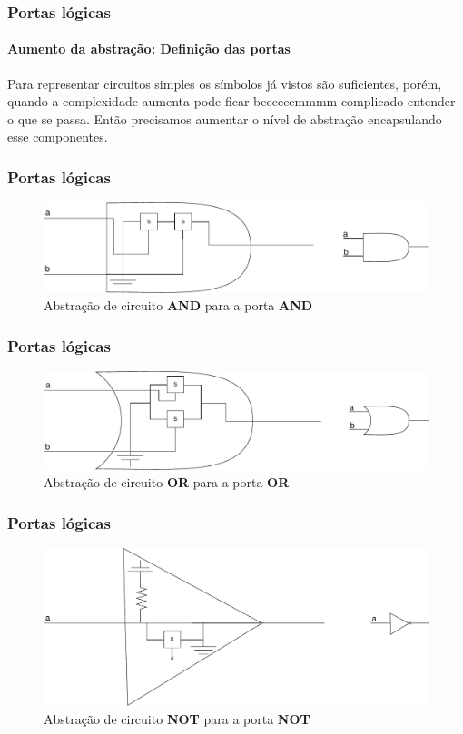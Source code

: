 \begin{frame}
	\frametitle{Portas lógicas}
	\framesubtitle{Aumento da abstração: Definição das portas}
	\par Para representar circuitos simples os símbolos já vistos são suficientes, porém, quando a complexidade aumenta pode ficar beeeeeemmmm complicado entender o que se passa. Então precisamos aumentar o nível de abstração encapsulando esse componentes.
\end{frame}

\begin{frame}
	\frametitle{Portas lógicas}
	\begin{figure}
		\centering
		\includegraphics[width=0.7\linewidth]{images/portaEAbstrata}
		\caption{Abstração de circuito \textbf{AND} para a porta \textbf{AND}}
		\label{fig:portaeabstrata}
	\end{figure}
\end{frame}

\begin{frame}
	\frametitle{Portas lógicas}
	\begin{figure}
		\centering
		\includegraphics[width=0.7\linewidth]{images/portaOUAbstrata}
		\caption{Abstração de circuito \textbf{OR} para a porta \textbf{OR}}
		\label{fig:portaouabstrata}
	\end{figure}
\end{frame}

\begin{frame}
	\frametitle{Portas lógicas}
	\begin{figure}
		\centering
		\includegraphics[width=0.7\linewidth]{images/portaNOTAbstrata}
		\caption{Abstração de circuito \textbf{NOT} para a porta \textbf{NOT}}
		\label{fig:portanotabstrata}
	\end{figure}
\end{frame}

